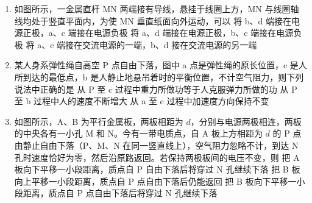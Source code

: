 \documentclass[\gkver]{gaokaozhenti}
\begin{document}
\begin{enumerate}

\item
如图所示，一金属直杆 MN 两端接有导线，悬挂于线圈上方，MN 与线圈轴线均处于竖直平面内，为使 MN 垂直纸面向外运动，可以
\onepicture[w=5cm]{}
{将 b、d 端接在电源正极，a、c 端接在电源负极}
{将 a、d 端接在电源正极，b、c 端接在电源负极}
{将 a、c 端接在交流电源的一端，b、d 接在交流电源的另一端}


\item
某人身系弹性绳自高空 P 点自由下落，图中 a 点是弹性绳的原长位置，c 是人所到达的最低点，b 是人静止地悬吊着时的平衡位置，不计空气阻力，则下列说法中正确的是
\onepicture[h=5cm]{}
{从 P 至 c 过程中重力所做功等于人克服弹力所做的功}
{从 P 至 b 过程中人的速度不断增大}
{从 a 至 c 过程中加速度方向保持不变}


\item
如图所示，A、B 为平行金属板，两板相距为 $d$，分别与电源两极相连，两板的中央各有一小孔 M 和 N。今有一带电质点，自 A 板上方相距为 $d$ 的 P 点由静止自由下落（P、M、N 在同一竖直线上），空气阻力忽略不计，到达 N 孔时速度恰好为零，然后沿原路返回。若保持两极板间的电压不变，则
\onepicture[w=6cm]{}
{把 A 板向下平移一小段距离，质点自 P 自由下落后将穿过 N 孔继续下落}
{把 B 板向上平移一小段距离，质点自 P 点自由下落后仍能返回}
{把 B 板向下平移一小段距离，质点自 P 点自由下落后将穿过 N 孔继续下落}



\end{enumerate}
\end{document}
